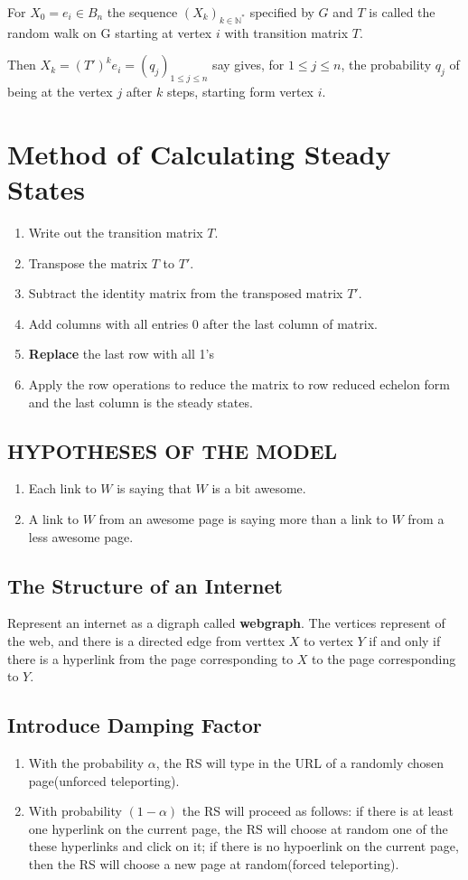 \documentclass{article}
\begin{document}
\begin{spacing}{1.5}
For $X_0=e_i \in B_n$ the sequence $(X_k)_{k \in \mathbb{N^*}} $
specified by $G$ and $T$ is called the random walk on G starting at vertex $i$ with transition matrix $T$. 

Then $X_k = (T')^k e_i = (q_j)_{1 \le j \le n}$ say gives, for $1 \le j \le n$, the probability $q_j$ of being at the vertex $j$ after $k$ steps, starting form vertex $i$. 
\section{Method of Calculating Steady States}
\begin{enumerate}
    \item Write out the transition matrix $T$. 
    \item Transpose the matrix $T$ to $T'$.
    \item Subtract the identity matrix from the transposed matrix $T'$. 
    \item Add columns with all entries 0 after the last column of matrix. 
    \item \textbf{Replace} the last row with all 1's
    \item Apply the row operations to reduce the matrix to row reduced echelon form and the last column is the steady states. 
\end{enumerate}
\subsection{HYPOTHESES OF THE MODEL}
\begin{enumerate}
    \item Each link to $W$ is saying that $W$ is a bit awesome.
    \item A link to $W$ from an awesome page is saying more than a link to $W$ from a less awesome page.  
\end{enumerate}
\subsection{The Structure of an Internet}
Represent an internet as a digraph called \textbf{webgraph}. The vertices represent of the web, and there is a directed edge from verttex $X$ to vertex $Y$ if and only if there is a hyperlink from the page corresponding to $X$ to the page corresponding to $Y$. 
\subsection{Introduce Damping Factor}
\begin{enumerate}
    \item With the probability $\alpha$, the RS will type in the URL of a randomly chosen page(unforced teleporting).
    \item With probability $(1-\alpha)$ the RS will proceed as follows: if there is at least one hyperlink on the current page, the RS will choose at random one of the these hyperlinks and click on it; if there is no hypoerlink on the current page, then the RS will choose a new page at random(forced teleporting).
\end{enumerate}

\end{spacing}
\end{document}
